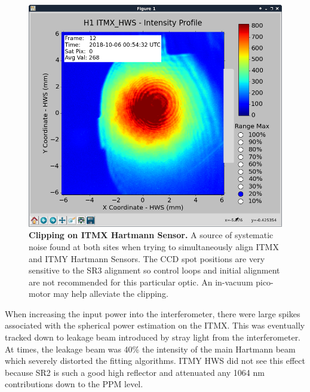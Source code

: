 	\begin{figure}[t!]
		\centering
		\includegraphics[width=0.4\textheight]{../Figures/ITMX_HWS_clipping.png}
		\caption[Clipping on ITMX Hartmann Sensor.] 
		{\textbf{Clipping on ITMX Hartmann Sensor.}  A source of systematic noise found at both sites when trying to simultaneously align ITMX and ITMY Hartmann Sensors.  The CCD spot positions are very sensitive to the SR3 alignment so control loops and initial alignment are not recommended for this particular optic.  An in-vacuum pico-motor may help alleviate the clipping.
		}
		\label{fig:ITMX_clipping}
	\end{figure}
	
	When increasing the input power into the interferometer, there were large spikes associated with the spherical power estimation on the ITMX.  This was eventually tracked down to leakage beam introduced by stray light from the interferometer.  At times, the leakage beam was 40\% the intensity of the main Hartmann beam which severely distorted the fitting algorithms. ITMY HWS did not see this effect because SR2 is such a good high reflector and attenuated any 1064 nm contributions down to the PPM level.
	
